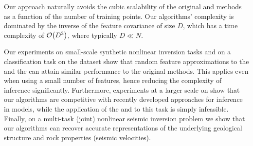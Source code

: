 Our approach naturally avoids the cubic scalability of the original \egp and
\ugp methods \citep{steinberg-bonilla-nips-2014} as a function of the number of
training points. Our algorithms' complexity is dominated by the inverse of the
feature covariance of size $D$, which has a time complexity of $\mathcal{O}\!\left({{D^3}}\right)$,
where typically $D \ll N$. 

Our experiments on small-scale synthetic nonlinear inversion tasks and on a
classification task on the \usps dataset show that random feature
approximations to the \egp and the \ugp can attain similar performance to the
original methods. This applies even when using a small number of features,
hence reducing the complexity of inference significantly. Furthermore,
experiments at a larger scale on  \mnist  show that our algorithms
are competitive with recently developed approaches for inference in \gp models,
while the application of the \egp and \ugp to this task is simply infeasible.
Finally, on a multi-task (joint) nonlinear seismic inversion  problem we show
that our algorithms can recover accurate representations of the underlying
geological structure and rock properties (seismic velocities).









